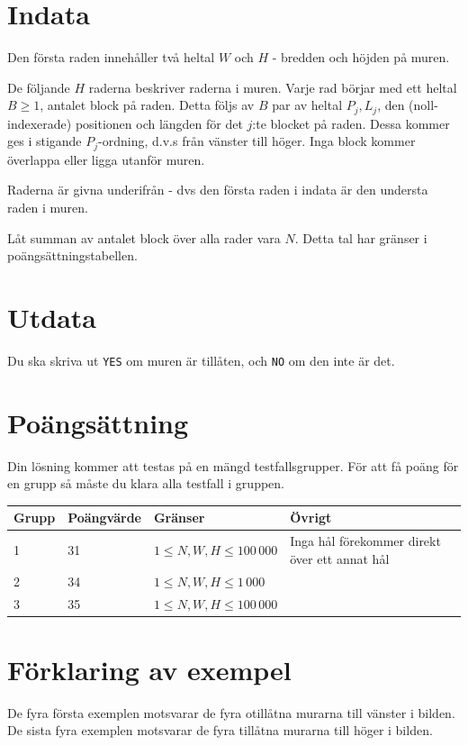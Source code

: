 \section*{Indata}
Den första raden innehåller två heltal $W$ och $H$ - bredden och höjden på muren.

De följande $H$ raderna beskriver raderna i muren.
Varje rad börjar med ett heltal $B \ge 1$, antalet block på raden.
Detta följs av $B$ par av heltal $P_j, L_j$, den (noll-indexerade) positionen och längden för det $j$:te blocket på raden. Dessa kommer ges i stigande $P_j$-ordning, d.v.s från vänster till höger.
Inga block kommer överlappa eller ligga utanför muren.

Raderna är givna underifrån - dvs den första raden i indata är den understa raden i muren.

Låt summan av antalet block över alla rader vara $N$.
Detta tal har gränser i poängsättningstabellen.

\section*{Utdata}
Du ska skriva ut \texttt{YES} om muren är tillåten, och \texttt{NO} om den inte är det.

\section*{Poängsättning}
Din lösning kommer att testas på en mängd testfallsgrupper. För att få poäng för en grupp
så måste du klara alla testfall i gruppen.

\noindent
\begin{tabular}{| l | l | l | l |}
\hline
Grupp & Poängvärde & Gränser & Övrigt \\ \hline
1     & 31         & $1 \le N, W, H \le 100\,000$ & Inga hål förekommer direkt över ett annat hål \\ \hline
2     & 34         & $1 \le N, W, H \le 1\,000$ & \\ \hline
3     & 35         & $1 \le N, W, H \le 100\,000$ & \\ \hline
\end{tabular}

\section*{Förklaring av exempel}
De fyra första exemplen motsvarar de fyra otillåtna murarna till vänster i bilden.
De sista fyra exemplen motsvarar de fyra tillåtna murarna till höger i bilden.
